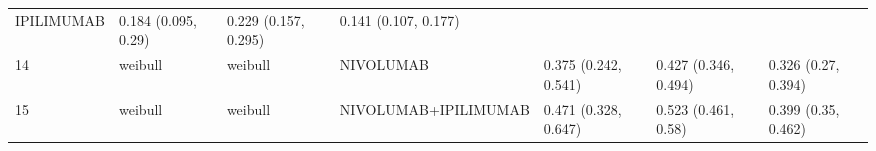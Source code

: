\documentclass[
]{article}
\begin{document}
\begin{longtable}[]{@{}lllllll@{}}
\begin{minipage}[t]{0.15\columnwidth}
IPILIMUMAB\strut
\end{minipage} & \begin{minipage}[t]{0.15\columnwidth}\raggedright
0.184 (0.095, 0.29)\strut
\end{minipage} & \begin{minipage}[t]{0.15\columnwidth}\raggedright
0.229 (0.157, 0.295)\strut
\end{minipage} & \begin{minipage}[t]{0.15\columnwidth}\raggedright
0.141 (0.107, 0.177)\strut
\end{minipage}\tabularnewline
\begin{minipage}[t]{0.03\columnwidth}\raggedright
14\strut
\end{minipage} & \begin{minipage}[t]{0.09\columnwidth}\raggedright
weibull\strut
\end{minipage} & \begin{minipage}[t]{0.09\columnwidth}\raggedright
weibull\strut
\end{minipage} & \begin{minipage}[t]{0.15\columnwidth}\raggedright
NIVOLUMAB\strut
\end{minipage} & \begin{minipage}[t]{0.15\columnwidth}\raggedright
0.375 (0.242, 0.541)\strut
\end{minipage} & \begin{minipage}[t]{0.15\columnwidth}\raggedright
0.427 (0.346, 0.494)\strut
\end{minipage} & \begin{minipage}[t]{0.15\columnwidth}\raggedright
0.326 (0.27, 0.394)\strut
\end{minipage}\tabularnewline
\begin{minipage}[t]{0.03\columnwidth}\raggedright
15\strut
\end{minipage} & \begin{minipage}[t]{0.09\columnwidth}\raggedright
weibull\strut
\end{minipage} & \begin{minipage}[t]{0.09\columnwidth}\raggedright
weibull\strut
\end{minipage} & \begin{minipage}[t]{0.15\columnwidth}\raggedright
NIVOLUMAB+IPILIMUMAB\strut
\end{minipage} & \begin{minipage}[t]{0.15\columnwidth}\raggedright
0.471 (0.328, 0.647)\strut
\end{minipage} & \begin{minipage}[t]{0.15\columnwidth}\raggedright
0.523 (0.461, 0.58)\strut
\end{minipage} & \begin{minipage}[t]{0.15\columnwidth}\raggedright
0.399 (0.35, 0.462)\strut
\end{minipage}\tabularnewline
\bottomrule
\end{longtable}
\end{document}
